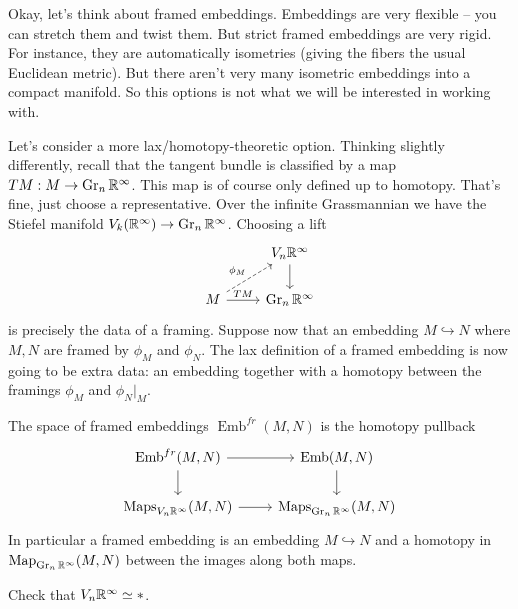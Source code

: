 \documentclass{amsart}
\DeclareMathOperator{\Emb}{Emb}
\begin{document}
Okay, let's think about framed embeddings. Embeddings are very flexible -- you can stretch
them and twist them. But strict framed embeddings are very rigid. For instance, they are
automatically isometries (giving the fibers the usual Euclidean metric). But there aren't
very many isometric embeddings into a compact manifold. So this options is not what we
will be interested in working with.

Let's consider a more lax/homotopy-theoretic option. Thinking slightly differently, recall
that the tangent bundle is classified by a map $TM: M\to \operatorname{Gr}_n\mathbb{R}^\infty$. This map is
of course only defined up to homotopy. That's fine, just choose a representative. Over
the infinite Grassmannian we have the Stiefel manifold $V_k(\mathbb{R}^\infty)\to\operatorname{Gr}_n\mathbb{R}^\infty$.
Choosing a lift
\begin{equation*}
    \begin{tikzcd}
        \; & V_n\R^\infty \dar \\
        M \rar{TM}\urar[dashed]{\phi_M} & \Gr_n\R^\infty
    \end{tikzcd}
\end{equation*}
is precisely the data of a framing. Suppose now that an embedding $M\hookrightarrow N$
where $M,N$ are framed by $\phi_M$ and $\phi_N$.
The lax definition of a framed embedding is now going to be extra data: an embedding
together with a homotopy between the framings $\phi_M$ and $\phi_N|_M$.


\begin{definition}
    The space of framed embeddings $\Emb^{fr}(M,N)$ is the homotopy pullback
    \begin{equation*}
        \begin{tikzcd}
            \Emb^{fr}(M,N) \rar\dar & \Emb(M,N)\dar  \\
            \Maps_{V_n\R^\infty}(M,N) \rar & \Maps_{\Gr_n\R^\infty}(M,N)
        \end{tikzcd}
    \end{equation*}
    In particular a framed embedding is an embedding $M\hookrightarrow N$ and
    a homotopy in $\operatorname*{Map}_{\operatorname{Gr}_n\mathbb{R}^\infty}(M,N)$ between the images along both maps.
\end{definition}

\begin{exercise}
    Check that $V_n\mathbb{R}^\infty\simeq *$.
\end{exercise}
\end{document}
